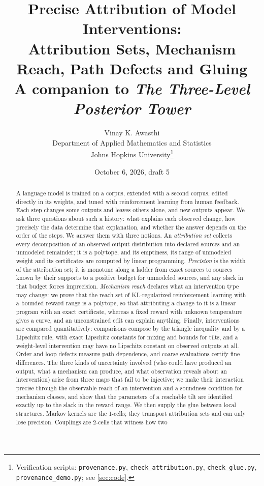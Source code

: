 \documentclass[11pt]{article}
\title{Precise Attribution of Model Interventions:\\
Attribution Sets, Mechanism Reach, Path Defects and Gluing\\[4pt]
\large A companion to \emph{The Three-Level Posterior Tower}}
\author{Vinay K. Awasthi\\
Department of Applied Mathematics and Statistics\\
Johns Hopkins University\thanks{Verification scripts: \texttt{provenance.py},
\texttt{check\_attribution.py}, \texttt{check\_glue.py}, \texttt{provenance\_demo.py}; see \cref{sec:code}.}}
\date{October 6, 2026, draft 5}
\theoremstyle{definition}
\theoremstyle{remark}
\begin{document}
\maketitle

\begin{abstract}
A language model is trained on a corpus, extended with a second corpus, edited directly in its
weights, and tuned with reinforcement learning from human feedback. Each step changes some outputs
and leaves others alone, and new outputs appear. We ask three questions about such a history: what
explains each observed change, how precisely the data determine that explanation, and whether the
answer depends on the order of the steps. We answer them with three notions. An \emph{attribution
set} collects every decomposition of an observed output distribution into declared sources and an
unmodeled remainder; it is a polytope, and its emptiness, its range of unmodeled weight and its
certificates are computed by linear programming. \emph{Precision} is the width of the attribution
set; it is monotone along a ladder from exact sources to sources known by their supports to a
positive budget for unmodeled sources, and any slack in that budget forces imprecision.
\emph{Mechanism reach} declares what an intervention type may change: we prove that the reach set of
KL-regularized reinforcement learning with a bounded reward range is a polytope, so that attributing
a change to it is a linear program with an exact certificate, whereas a fixed reward with unknown
temperature gives a curve, and an unconstrained edit can explain anything. Finally, interventions are
compared quantitatively: comparisons compose by the triangle inequality and by a Lipschitz rule, with
exact Lipschitz constants for mixing and bounds for tilts, and a weight-level intervention may have no
Lipschitz constant on observed outputs at all. Order and loop defects measure path dependence, and
coarse evaluations certify fine differences. The three kinds of uncertainty involved (who could
have produced an output, what a mechanism can produce, and what observation reveals about an
intervention) arise from three maps that fail to be injective; we make their interaction precise
through the observable reach of an intervention and a soundness condition for mechanism classes, and
show that the parameters of a reachable tilt are identified exactly up to the slack in the reward
range. We then supply the glue between local structures. Markov kernels are the 1-cells; they
transport attribution sets and can only lose precision. Couplings are 2-cells that witness how two

\end{abstract}
\end{document}
